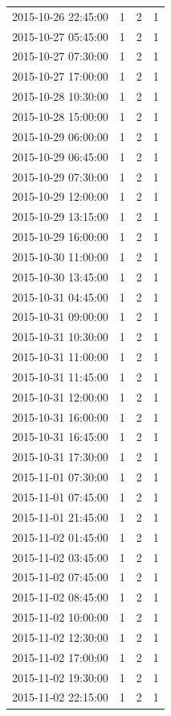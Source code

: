 \begin{tabular}{lrrr}
2015-10-26 22:45:00 & 1 & 2 & 1 \\
2015-10-27 05:45:00 & 1 & 2 & 1 \\
2015-10-27 07:30:00 & 1 & 2 & 1 \\
2015-10-27 17:00:00 & 1 & 2 & 1 \\
2015-10-28 10:30:00 & 1 & 2 & 1 \\
2015-10-28 15:00:00 & 1 & 2 & 1 \\
2015-10-29 06:00:00 & 1 & 2 & 1 \\
2015-10-29 06:45:00 & 1 & 2 & 1 \\
2015-10-29 07:30:00 & 1 & 2 & 1 \\
2015-10-29 12:00:00 & 1 & 2 & 1 \\
2015-10-29 13:15:00 & 1 & 2 & 1 \\
2015-10-29 16:00:00 & 1 & 2 & 1 \\
2015-10-30 11:00:00 & 1 & 2 & 1 \\
2015-10-30 13:45:00 & 1 & 2 & 1 \\
2015-10-31 04:45:00 & 1 & 2 & 1 \\
2015-10-31 09:00:00 & 1 & 2 & 1 \\
2015-10-31 10:30:00 & 1 & 2 & 1 \\
2015-10-31 11:00:00 & 1 & 2 & 1 \\
2015-10-31 11:45:00 & 1 & 2 & 1 \\
2015-10-31 12:00:00 & 1 & 2 & 1 \\
2015-10-31 16:00:00 & 1 & 2 & 1 \\
2015-10-31 16:45:00 & 1 & 2 & 1 \\
2015-10-31 17:30:00 & 1 & 2 & 1 \\
2015-11-01 07:30:00 & 1 & 2 & 1 \\
2015-11-01 07:45:00 & 1 & 2 & 1 \\
2015-11-01 21:45:00 & 1 & 2 & 1 \\
2015-11-02 01:45:00 & 1 & 2 & 1 \\
2015-11-02 03:45:00 & 1 & 2 & 1 \\
2015-11-02 07:45:00 & 1 & 2 & 1 \\
2015-11-02 08:45:00 & 1 & 2 & 1 \\
2015-11-02 10:00:00 & 1 & 2 & 1 \\
2015-11-02 12:30:00 & 1 & 2 & 1 \\
2015-11-02 17:00:00 & 1 & 2 & 1 \\
2015-11-02 19:30:00 & 1 & 2 & 1 \\
2015-11-02 22:15:00 & 1 & 2 & 1 \\

\end{tabular}
